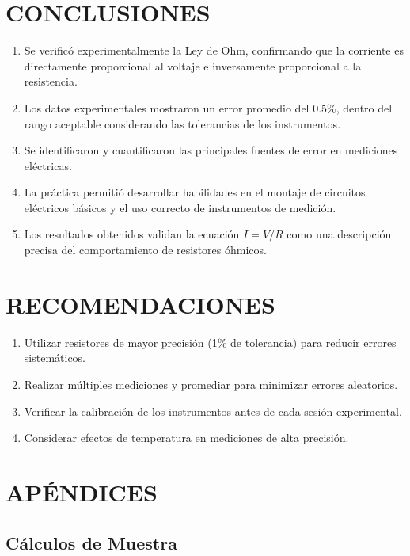 \documentclass[12pt]{article}
\begin{document}
\section{CONCLUSIONES}
\label{sec:conclusiones}

\begin{enumerate}
    \item Se verificó experimentalmente la Ley de Ohm, confirmando que la corriente es directamente proporcional al voltaje e inversamente proporcional a la resistencia.
    \item Los datos experimentales mostraron un error promedio del 0.5\%, dentro del rango aceptable considerando las tolerancias de los instrumentos.
    \item Se identificaron y cuantificaron las principales fuentes de error en mediciones eléctricas.
    \item La práctica permitió desarrollar habilidades en el montaje de circuitos eléctricos básicos y el uso correcto de instrumentos de medición.
    \item Los resultados obtenidos validan la ecuación $I = V/R$ como una descripción precisa del comportamiento de resistores óhmicos.
\end{enumerate}

\section{RECOMENDACIONES}
\label{sec:recomendaciones}

\begin{enumerate}
    \item Utilizar resistores de mayor precisión (1\% de tolerancia) para reducir errores sistemáticos.
    \item Realizar múltiples mediciones y promediar para minimizar errores aleatorios.
    \item Verificar la calibración de los instrumentos antes de cada sesión experimental.
    \item Considerar efectos de temperatura en mediciones de alta precisión.
\end{enumerate}

\section{APÉNDICES}
\label{sec:apendices}

\subsection{Cálculos de Muestra}
\end{document}
